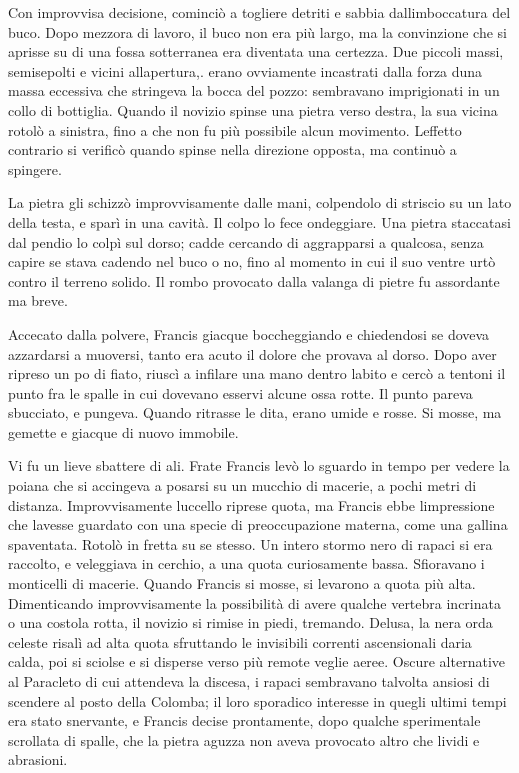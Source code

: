 Con improvvisa decisione, cominciò a togliere detriti e sabbia
dall\textquotesingle imboccatura del buco. Dopo mezz\textquotesingle ora
di lavoro, il buco non era più largo, ma la convinzione che si aprisse
su di una fossa sotterranea era diventata una certezza. Due piccoli
massi, semisepolti e vicini all\textquotesingle apertura,. erano
ovviamente incastrati dalla forza d\textquotesingle una massa eccessiva
che stringeva la bocca del pozzo: sembravano imprigionati in un collo di
bottiglia. Quando il novizio spinse una pietra verso destra, la sua
vicina rotolò a sinistra, fino a che non fu più possibile alcun
movimento. L\textquotesingle effetto contrario si verificò quando spinse
nella direzione opposta, ma continuò a spingere.

La pietra gli schizzò improvvisamente dalle mani, colpendolo di striscio
su un lato della testa, e sparì in una cavità. Il colpo lo fece
ondeggiare. Una pietra staccatasi dal pendio lo colpì sul dorso; cadde
cercando di aggrapparsi a qualcosa, senza capire se stava cadendo nel
buco o no, fino al momento in cui il suo ventre urtò contro il terreno
solido. Il rombo provocato dalla valanga di pietre fu assordante ma
breve.

Accecato dalla polvere, Francis giacque boccheggiando e chiedendosi se
doveva azzardarsi a muoversi, tanto era acuto il dolore che provava al
dorso. Dopo aver ripreso un po\textquotesingle{} di fiato, riuscì a
infilare una mano dentro l\textquotesingle abito e cercò a tentoni il
punto fra le spalle in cui dovevano esservi alcune ossa rotte. Il punto
pareva sbucciato, e pungeva. Quando ritrasse le dita, erano umide e
rosse. Si mosse, ma gemette e giacque di nuovo immobile.

Vi fu un lieve sbattere di ali. Frate Francis levò lo sguardo in tempo
per vedere la poiana che si accingeva a posarsi su un mucchio di
macerie, a pochi metri di distanza. Improvvisamente
l\textquotesingle uccello riprese quota, ma Francis ebbe
l\textquotesingle impressione che l\textquotesingle avesse guardato con
una specie di preoccupazione materna, come una gallina spaventata.
Rotolò in fretta su se stesso. Un intero stormo nero di rapaci si era
raccolto, e veleggiava in cerchio, a una quota curiosamente bassa.
Sfioravano i monticelli di macerie. Quando Francis si mosse, si levarono
a quota più alta. Dimenticando improvvisamente la possibilità di avere
qualche vertebra incrinata o una costola rotta, il novizio si rimise in
piedi, tremando. Delusa, la nera orda celeste risalì ad alta quota
sfruttando le invisibili correnti ascensionali d\textquotesingle aria
calda, poi si sciolse e si disperse verso più remote veglie aeree.
Oscure alternative al Paracleto di cui attendeva la discesa, i rapaci
sembravano talvolta ansiosi di scendere al posto della Colomba; il loro
sporadico interesse in quegli ultimi tempi era stato snervante, e
Francis decise prontamente, dopo qualche sperimentale scrollata di
spalle, che la pietra aguzza non aveva provocato altro che lividi e
abrasioni.

